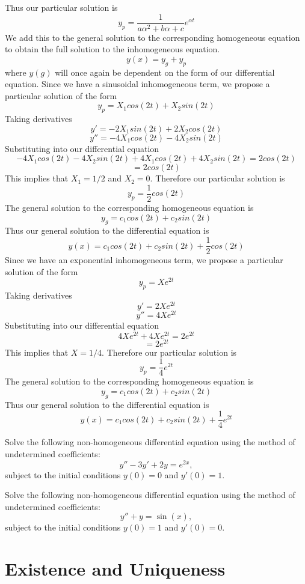 Thus our particular solution is
\[y_p = \frac{1}{a\alpha^2 + b\alpha + c}e^{\alpha t}\]
We add this to the general solution to the corresponding homogeneous equation to obtain the full solution to the inhomogeneous equation.
\[y(x) = y_g + y_p\]
where $y(g)$ will once again be dependent on the form of our differential equation.
Since we have a sinusoidal inhomogeneous term, we propose a particular solution of the form
\[y_p = X_1cos(2t) + X_2sin(2t)\]
Taking derivatives
\[y' = -2X_1sin(2t) + 2X_2cos(2t)\]
\[y'' = -4X_1cos(2t) - 4X_2sin(2t)\]
Substituting into our differential equation
\[-4X_1cos(2t) - 4X_2sin(2t) + 4X_1cos(2t) + 4X_2sin(2t) = 2cos(2t)\]
\[= 2cos(2t)\]
This implies that $X_1 = 1/2$ and $X_2 = 0$. Therefore our particular solution is
\[y_p = \frac{1}{2}cos(2t)\]
The general solution to the corresponding homogeneous equation is
\[y_g = c_1cos(2t) + c_2sin(2t)\]
Thus our general solution to the differential equation is
\[y(x) = c_1cos(2t) + c_2sin(2t) + \frac{1}{2}cos(2t)\]
Since we have an exponential inhomogeneous term, we propose a particular solution of the form
\[y_p = Xe^{2t}\]
Taking derivatives
\[y' = 2Xe^{2t}\]
\[y'' = 4Xe^{2t}\]
Substituting into our differential equation
\[4Xe^{2t} + 4Xe^{2t} = 2e^{2t}\]
\[= 2e^{2t}\]
This implies that $X = 1/4$. Therefore our particular solution is
\[y_p = \frac{1}{4}e^{2t}\]
The general solution to the corresponding homogeneous equation is
\[y_g = c_1cos(2t) + c_2sin(2t)\]
Thus our general solution to the differential equation is
\[y(x) = c_1cos(2t) + c_2sin(2t) + \frac{1}{4}e^{2t}\]
\exercises
\begin{exerciselist}
\item Solve the following non-homogeneous differential equation using the method of undetermined coefficients:
\[y'' - 3y' + 2y = e^{2x},\]
subject to the initial conditions $y(0) = 0$ and $y'(0) = 1$.   
\item Solve the following non-homogeneous differential equation using the method of undetermined coefficients:
\[y'' + y = \sin(x),\]
subject to the initial conditions $y(0) = 1$ and $y'(0) = 0$.
\end{exerciselist}
\section{Existence and Uniqueness}
